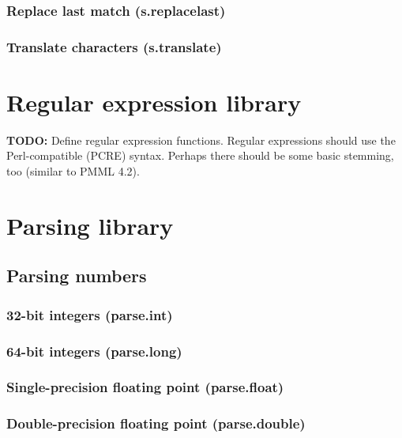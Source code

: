 \documentclass{article}
\theoremstyle{definition}
\begin{document}
\subsubsection{Replace last match (s.replacelast)}

\subsubsection{Translate characters (s.translate)}

\pagebreak

\section{Regular expression library}

{\bf TODO:} Define regular expression functions.  Regular expressions should use the Perl-compatible (PCRE) syntax.  Perhaps there should be some basic stemming, too (similar to PMML 4.2).

\pagebreak

\section{Parsing library}

\subsection{Parsing numbers}

\subsubsection{32-bit integers (parse.int)}

\subsubsection{64-bit integers (parse.long)}

\subsubsection{Single-precision floating point (parse.float)}

\subsubsection{Double-precision floating point (parse.double)}
\end{document}
